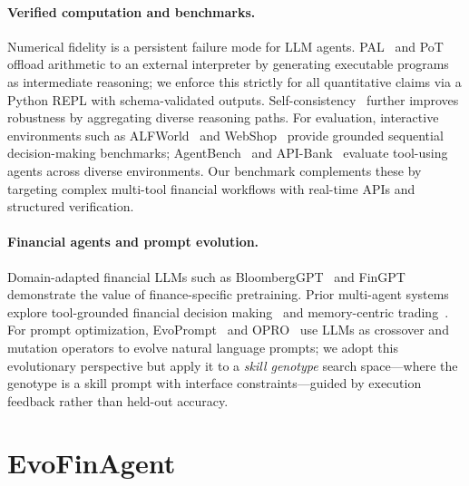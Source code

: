 \documentclass{article}
\begin{document}
\paragraph{Verified computation and benchmarks.}
Numerical fidelity is a persistent failure mode for LLM agents. PAL~\citep{gao2022pal} and PoT~\citep{chen2022pot} offload arithmetic to an external interpreter by generating executable programs as intermediate reasoning; we enforce this strictly for all quantitative claims via a Python REPL with schema-validated outputs. Self-consistency~\citep{wang2023selfconsistency} further improves robustness by aggregating diverse reasoning paths. For evaluation, interactive environments such as ALFWorld~\citep{shridhar2021alfworld} and WebShop~\citep{yao2022webshop} provide grounded sequential decision-making benchmarks; AgentBench~\citep{liu2023agentbench} and API-Bank~\citep{li2023apibank} evaluate tool-using agents across diverse environments. Our benchmark complements these by targeting complex multi-tool financial workflows with real-time APIs and structured verification.

\paragraph{Financial agents and prompt evolution.}
Domain-adapted financial LLMs such as BloombergGPT~\citep{wu2023bloomberggpt} and FinGPT~\citep{yang2023fingpt} demonstrate the value of finance-specific pretraining. Prior multi-agent systems explore tool-grounded financial decision making~\citep{tradingagents2024,fincon2024} and memory-centric trading~\citep{finmem2023}. For prompt optimization, EvoPrompt~\citep{evoprompt2024} and OPRO~\citep{opro2023} use LLMs as crossover and mutation operators to evolve natural language prompts; we adopt this evolutionary perspective but apply it to a \emph{skill genotype} search space—where the genotype is a skill prompt with interface constraints—guided by execution feedback rather than held-out accuracy.

\section{EvoFinAgent}
\end{document}
